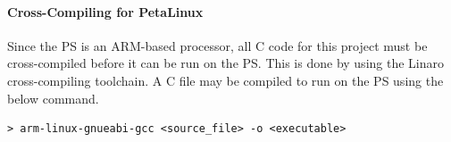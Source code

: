 \paragraph{Cross-Compiling for PetaLinux}
Since the PS is an ARM-based processor, all C code for this project must be cross-compiled before it can be run on the PS. This is done by using the Linaro cross-compiling toolchain. A C file may be compiled to run on the PS using the below command.
\begin{lstlisting}
> arm-linux-gnueabi-gcc <source_file> -o <executable>
\end{lstlisting}
